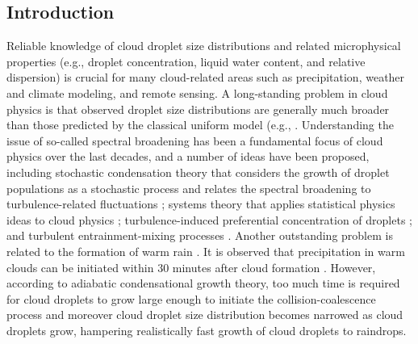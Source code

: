 \documentclass[draft,jgrga]{AGUTeX}
\begin{document}
\begin{article}

\section{Introduction}
Reliable knowledge of cloud droplet size distributions and related microphysical properties (e.g., droplet concentration, liquid water content, and relative dispersion) is crucial for many cloud-related areas such as precipitation, weather and climate modeling, and remote sensing. A long-standing problem in cloud physics is that observed droplet size distributions are generally much broader than those predicted by the classical uniform model (e.g., \cite{Howell1949, HudsonYum1997, YumHudson2001, YumHudson2005}. Understanding the issue of so-called spectral broadening has been a fundamental focus of cloud physics over the last decades, and a number of ideas have been proposed, including stochastic condensation theory that considers the growth of droplet populations as a stochastic process and relates the spectral broadening to turbulence-related fluctuations \cite{Zhou1964, Sedunov1974, MacGrawLiu2006, KhvorostyanovCurry1999}; systems theory that applies statistical physics ideas to cloud physics \cite{Liu1995, LiuHallett1997, LiuHallett1998, Liu2002, Yano2016}; turbulence-induced preferential concentration of droplets \cite{Shaw1998}; and turbulent entrainment-mixing processes \cite{Warner1973, Baker1980, Hicks1990, TelfordChai1980, Su1998, Lu2013}. Another outstanding problem is related to the formation of warm rain \cite{McGrawLiu2003,MacGrawLiu2004}. It is observed that precipitation in warm clouds can be initiated within $30$ minutes after cloud formation \cite{RogersYau1996}. However, according to adiabatic condensational growth theory, too much time is required for cloud droplets to grow large enough to initiate the collision-coalescence process and moreover cloud droplet size distribution becomes narrowed as cloud droplets grow, hampering realistically fast growth of cloud droplets to raindrops. 


\end{article}
\end{document}
